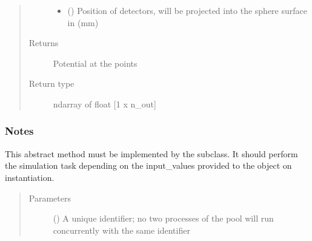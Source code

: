\documentclass[letterpaper,10pt,english,openany,oneside]{sphinxmanual}
\begin{document}
\begin{fulllineitems}
\begin{quote}
\begin{description}
\begin{itemize}
\item {} 
\sphinxstyleliteralstrong{\sphinxupquote{{[}}}\sphinxstyleliteralstrong{\sphinxupquote{{]}}} (\sphinxstyleliteralemphasis{\sphinxupquote{ {[}}}\sphinxstyleliteralemphasis{\sphinxupquote{{]}}}) \textendash{} Position of detectors, will be projected into the sphere surface in (mm)

\end{itemize}

\item[{Returns}] \leavevmode
{} \textendash{} Potential at the points

\item[{Return type}] \leavevmode
ndarray of float {[}1 x n\_out{]}

\end{description}\end{quote}
\subsubsection*{Notes}

\begin{fulllineitems}
\label{\detokenize{pygpc.testfunctions:pygpc.testfunctions.testfunctions.PotentialHomogeneousDipole.simulate}}
This abstract method must be implemented by the subclass.
It should perform the simulation task depending on the input\_values provided to the object on instantiation.
\begin{quote}\begin{description}
\item[{Parameters}] \leavevmode
{} () \textendash{} A unique identifier; no two processes of the pool will run concurrently with the same identifier

\end{description}\end{quote}

\end{fulllineitems}



\end{fulllineitems}
\end{document}
